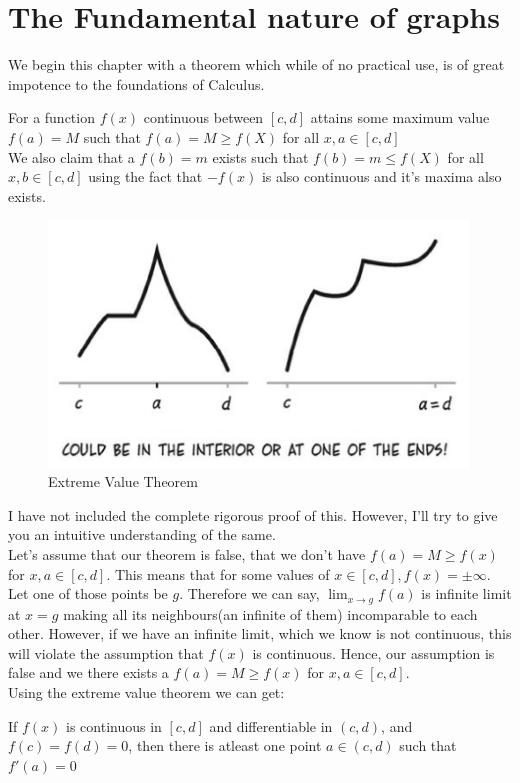 \section{The Fundamental nature of graphs}
We begin this chapter with a theorem which while of no practical use, is of great impotence to the foundations of Calculus.\\
\begin{theorem}
    For a function $f(x)$ continuous between $[c,d]$ attains some maximum value $f(a)=M$ such that $f(a)=M\geq f(X)$ for all $x,a \in [c,d]$\\
    We also claim that a $f(b)=m$ exists such that $f(b)=m\leq f(X)$ for all $x,b \in [c,d]$ using the fact that $-f(x)$ is also continuous and it's maxima also exists.
    \begin{figure}[ht]
        \centering
        \includegraphics[width=0.5\linewidth]{Photos/Extreme value theorem.png}
        \caption{Extreme Value Theorem}
        
    \end{figure}
\end{theorem}
I have not included the complete rigorous proof of this. However, I'll try to give you an intuitive understanding of the same.\\
Let's assume that our theorem is false, that we don't have $f(a)=M \geq f(x)$ for $x,a \in [c,d]$. This means that for some values of $x \in [c,d], f(x)=\pm \infty$. Let one of those points be $g$. Therefore we can say, $\lim_{x \to g}f(a)$ is infinite limit at $x=g$ making all its neighbours(an infinite of them) incomparable to each other. However, if we have an infinite limit, which we know is not continuous, this will violate the assumption that $f(x)$ is continuous. Hence, our assumption is false and we there exists a $f(a)=M \geq f(x)$ for $x,a \in [c,d]$.\\
Using the extreme value theorem we can get:\\
\begin{theorem}
    If $f(x)$ is continuous in $[c,d]$ and differentiable in $(c,d)$, and $f(c)=f(d)=0$, then there is atleast one point $a \in (c,d)$ such that $f'(a)=0$\\
\end{theorem}
